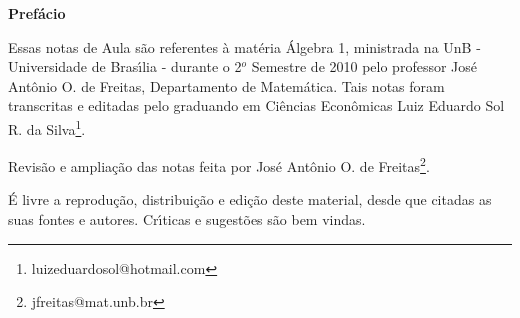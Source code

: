 \begin{center}
\Huge \textbf{Pref{\'a}cio}
\end{center}

Essas notas de Aula s{\~a}o referentes {\`a} mat{\'e}ria {\'A}lgebra 1,
ministrada na UnB - Universidade de Bras{\'\i}lia - durante o 2$^o$ Semestre de 2010
pelo professor Jos{\'e} Ant{\^o}nio O. de Freitas, Departamento de Matem{\'a}tica. Tais
notas foram transcritas e editadas pelo graduando em Ci{\^e}ncias Econ{\^o}micas
Luiz Eduardo Sol R. da Silva\footnote{luizeduardosol@hotmail.com}.

Revisão e ampliação das notas feita por José Antônio O. de Freitas\footnote{jfreitas@mat.unb.br}.


{\'E} livre a reprodu{\c c}{\~a}o, distribui{\c c}{\~a}o e edi{\c c}{\~a}o deste material, desde que citadas as suas fontes e autores. Cr{\'\i}ticas e sugest{\~o}es s{\~a}o bem vindas.
\vspace{20cm}






